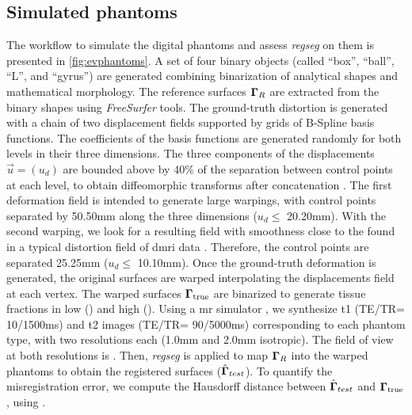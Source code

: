 \subsection{Simulated phantoms}\label{sec:digital_phantoms}
The workflow to simulate the digital phantoms and assess
  \emph{regseg} on them is presented in \autoref{fig:evphantoms}.
A set of four binary objects (called ``box'', ``ball'', ``L'',
  and ``gyrus'') are generated combining binarization of
  analytical shapes and mathematical morphology.
The reference surfaces $\boldsymbol{\Gamma}_R$ are extracted from the binary shapes
  using \emph{FreeSurfer} tools.
The ground-truth distortion is generated with a chain of two displacement 
  fields supported by grids of B-Spline basis functions.
The coefficients of the basis functions are generated randomly for
  both levels in their three dimensions.
The three components of the displacements $\vec{u} = (u_d)$ 
  are bounded above by 40\% of the separation between control points
  at each level, to obtain diffeomorphic transforms
  after concatenation \citep{rueckert_diffeomorphic_2006}.
The first deformation field is intended to generate large warpings,
  with control points separated by 50.50mm along the three dimensions
  ($u_d\leq$ 20.20mm).
With the second warping, we look for a resulting field with smoothness
  close to the found in a typical distortion field of \gls*{dmri} data
  \citep{irfanoglu_susceptibility_2011}.
Therefore, the control points are separated 25.25mm ($u_d\leq$ 10.10mm).
Once the ground-truth deformation is generated, the original surfaces
  are warped interpolating the displacements field at each vertex.
The warped surfaces $\boldsymbol{\Gamma}_\text{true}$ are binarized to generate tissue fractions
  in low () and high ().
Using a \gls*{mr} simulator \citep{caruyer_phantomas_2014}, we synthesize
  \gls*{t1} (TE/TR= 10/1500ms) and \gls*{t2} images (TE/TR= 90/5000ms)
  corresponding to each phantom type, with two resolutions each
  (1.0mm and 2.0mm isotropic).
The field of view at both resolutions is .
Then, \emph{regseg} is applied to map $\boldsymbol{\Gamma}_R$ into the warped phantoms to
  obtain the registered surfaces ($\hat{\boldsymbol{\Gamma}}_{test}$).
To quantify the misregistration error, we compute the Hausdorff distance between
 $\hat{\boldsymbol{\Gamma}}_{test}$ and $\boldsymbol{\Gamma}_\text{true}$, using \citep{commandeur_vtk_2011}.

